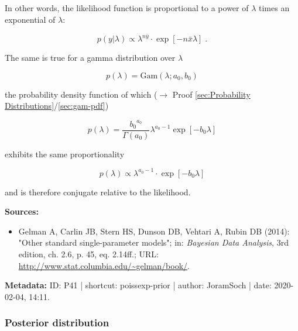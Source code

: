 \documentclass[a4paper,12pt]{book}
\begin{document}
In other words, the likelihood function is proportional to a power of $\lambda$ times an exponential of $\lambda$:

\begin{equation} \label{eq:poissexp-prior-Poiss-exp-LF-prop}
p(y|\lambda) \propto \lambda^{n \bar{y}} \cdot \exp\left[-n \bar{x} \lambda\right] \; .
\end{equation}

The same is true for a gamma distribution over $\lambda$

\begin{equation} \label{eq:poissexp-prior-Poiss-exp-prior-s1}
p(\lambda) = \mathrm{Gam}(\lambda; a_0, b_0)
\end{equation}

the probability density function of which ($\rightarrow$ Proof \ref{sec:Probability Distributions}/\ref{sec:gam-pdf})

\begin{equation} \label{eq:poissexp-prior-Poiss-exp-prior-s2}
p(\lambda) = \frac{ {b_0}^{a_0}}{\Gamma(a_0)} \lambda^{a_0-1} \exp[-b_0 \lambda]
\end{equation}

exhibits the same proportionality

\begin{equation} \label{eq:poissexp-prior-Poiss-exp-prior-s3}
p(\lambda) \propto \lambda^{a_0-1} \cdot \exp[-b_0 \lambda]
\end{equation}

and is therefore conjugate relative to the likelihood.

\vspace{1em}
\textbf{Sources:}
\begin{itemize}
\item Gelman A, Carlin JB, Stern HS, Dunson DB, Vehtari A, Rubin DB (2014): "Other standard single-parameter models"; in: \textit{Bayesian Data Analysis}, 3rd edition, ch. 2.6, p. 45, eq. 2.14ff.; URL: \url{http://www.stat.columbia.edu/~gelman/book/}.
\end{itemize}


\vspace{1em}
\textbf{Metadata:} ID: P41 | shortcut: poissexp-prior | author: JoramSoch | date: 2020-02-04, 14:11.


\subsubsection[\textbf{Posterior distribution}]{Posterior distribution} \label{sec:poissexp-post}
\end{document}
